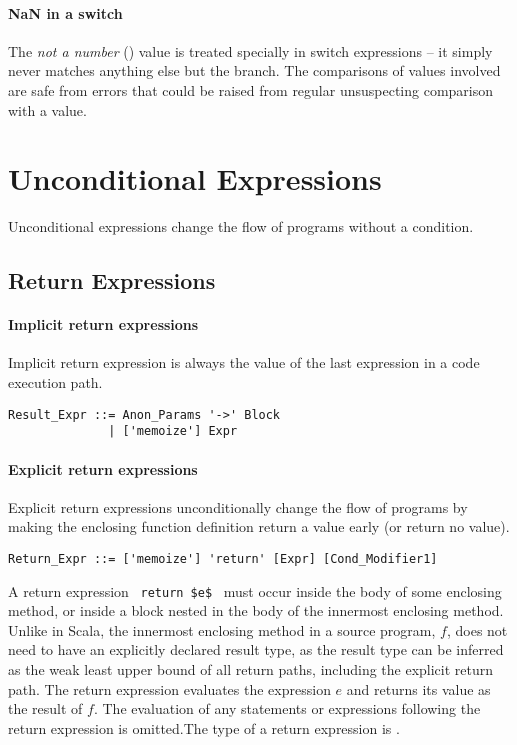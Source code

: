 \paragraph{NaN in a switch}
The {\em not a number} () value is treated specially in switch expressions -- it simply never matches anything else but the  branch. The comparisons of values involved are safe from errors that could be raised from regular unsuspecting comparison with a  value. 






\section{Unconditional Expressions}

Unconditional expressions change the flow of programs without a condition. 

\subsection{Return Expressions}
\label{sec:return-expressions}

\paragraph{Implicit return expressions}
Implicit return expression is always the value of the last expression in a code execution path. 

\syntax\begin{lstlisting}
Result_Expr ::= Anon_Params '->' Block 
              | ['memoize'] Expr
\end{lstlisting}

\paragraph{Explicit return expressions}
Explicit return expressions unconditionally change the flow of programs by making the enclosing function definition return a value early (or return no value). 

\syntax\begin{lstlisting}
Return_Expr ::= ['memoize'] 'return' [Expr] [Cond_Modifier1]
\end{lstlisting}

A return expression ~\lstinline!return $e$!~ must occur inside the body of some enclosing method, or inside a block nested in the body of the innermost enclosing method. Unlike in Scala, the innermost enclosing method in a source program, $f$, does not need to have an explicitly declared result type, as the result type can be inferred as the weak least upper bound of all return paths, including the explicit return path. The return expression evaluates the expression $e$ and returns its value as the result of $f$. The evaluation of any statements or expressions following the return expression is omitted.The type of a return expression is .


